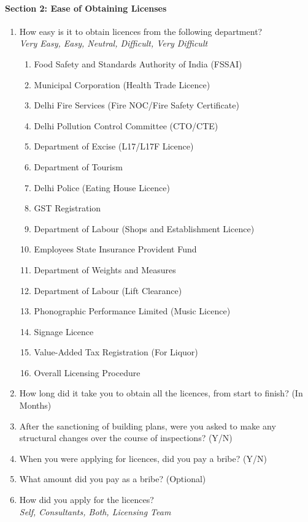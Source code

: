 \documentclass[a4paper, 12pt]{article}
\begin{document}
	\paragraph {Section 2: Ease of Obtaining Licenses}
		\begin {enumerate}[nosep]
		\item How easy is it to obtain licences from the following department?\\ 
		\textit{Very Easy, Easy, Neutral, Difficult, Very Difficult}
			\begin {enumerate}[nosep]
			\item Food Safety and Standards Authority of India (FSSAI)
			\item Municipal Corporation (Health Trade Licence)
			\item Delhi Fire Services (Fire NOC/Fire Safety Certificate)
			\item Delhi Pollution Control Committee (CTO/CTE)
			\item Department of Excise (L17/L17F Licence)
			\item Department of Tourism
			\item Delhi Police (Eating House Licence)
			\item GST Registration
			\item Department of Labour (Shops and Establishment Licence)
			\item Employees State Insurance Provident Fund
			\item Department of Weights and Measures
			\item Department of Labour (Lift Clearance)
			\item Phonographic Performance Limited (Music Licence)
			\item Signage Licence
			\item Value-Added Tax Registration (For Liquor)
			\item Overall Licensing Procedure
			\end {enumerate}
		\item How long did it take you to obtain all the licences, from start to finish? (In Months)
		\item After the sanctioning of building plans, were you asked to make any structural changes over the course of inspections? (Y/N)
		\item When you were applying for licences, did you pay a bribe? (Y/N)
		\item What amount did you pay as a bribe? (Optional)
		\item How did you apply for the licences?\\
		\textit{Self, Consultants, Both, Licensing Team}
		\end {enumerate}
\end{document}
